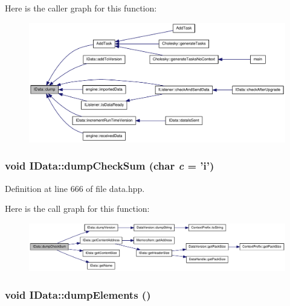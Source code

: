 Here is the caller graph for this function:\nopagebreak
\begin{figure}[H]
\begin{center}
\leavevmode
\includegraphics[width=347pt]{class_i_data_aae35cd74cf8b062a958959d606d73f29_icgraph}
\end{center}
\end{figure}
\hypertarget{class_i_data_a5208ed47b42d73d60384d882d23c43ce}{
\subsubsection[{dumpCheckSum}]{\setlength{\rightskip}{0pt plus 5cm}void IData::dumpCheckSum (char {\em c} = {\ttfamily 'i'})}}
\label{class_i_data_a5208ed47b42d73d60384d882d23c43ce}


Definition at line 666 of file data.hpp.

Here is the call graph for this function:\nopagebreak
\begin{figure}[H]
\begin{center}
\leavevmode
\includegraphics[width=419pt]{class_i_data_a5208ed47b42d73d60384d882d23c43ce_cgraph}
\end{center}
\end{figure}
\hypertarget{class_i_data_a2e42247007317b7451d50eb562a8ead1}{
\subsubsection[{dumpElements}]{\setlength{\rightskip}{0pt plus 5cm}void IData::dumpElements ()}}
\label{class_i_data_a2e42247007317b7451d50eb562a8ead1}


